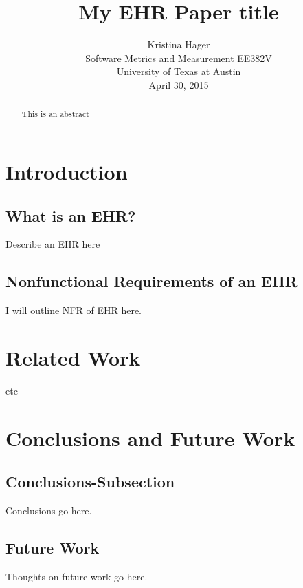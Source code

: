 \documentclass[10pt]{article}
\begin{document}
\title{My EHR Paper title}

\author{Kristina Hager\\
Software Metrics and Measurement EE382V\\
University of Texas at Austin\\
April 30, 2015\\
}

\maketitle
\thispagestyle{empty}

\begin{abstract}
	This is an abstract
\end{abstract}


\section{Introduction}

\subsection{What is an EHR?}
\label{sec:What is an EHR}
Describe an EHR here \cite{auditingprivacy}


\subsection{Nonfunctional Requirements of an EHR}
\label{sec:Nonfunctional Requirements of an EHR}
I will outline NFR of EHR here.

\section{Related Work}
\label{sec:Related}
etc

\section{Conclusions and Future Work}

\subsection{Conclusions-Subsection}
\label{sec:Conclusions-Subsection}

Conclusions go here. 

\subsection{Future Work}
\label{sec:Future Work}
Thoughts on future work go here.



\end{document}
